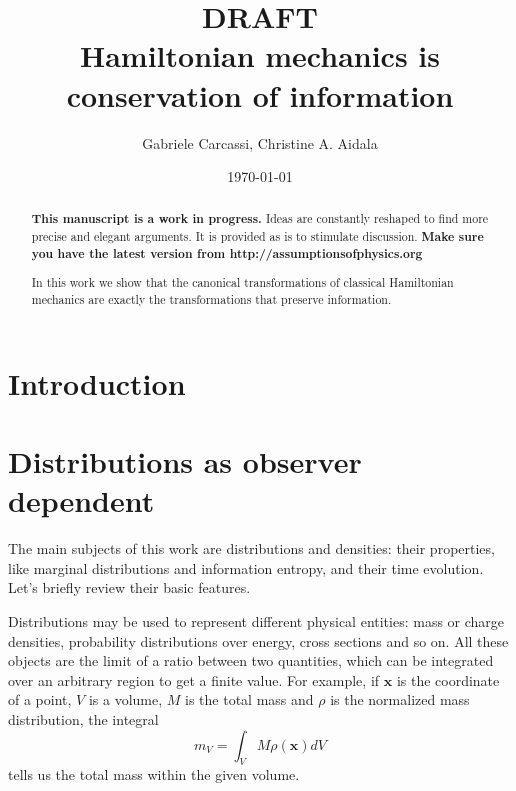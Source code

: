 \documentclass[smallextended]{svjour3}
\numberwithin{equation}{section}
\theoremstyle{definition}
\newcommand{\journal}[1]{\ifjournal#1\fi}
\newcommand{\arxiv}[1]{\ifjournal\else#1\fi}
\begin{document}
\title{DRAFT \\ Hamiltonian mechanics is conservation of information}
\author{Gabriele Carcassi, Christine A. Aidala}

\ifjournal
\else
\fi


\date{\today}

\journal{\maketitle}
	
\begin{abstract}
\textbf{This manuscript is a work in progress.} Ideas are constantly reshaped to find more precise and elegant arguments. It is provided as is to stimulate discussion.  \textbf{Make sure you have the latest version from http://assumptionsofphysics.org}

In this work we show that the canonical transformations of classical Hamiltonian mechanics are exactly the transformations that preserve information.
\end{abstract}

\arxiv{\maketitle}

\section{Introduction}

\section{Distributions as observer dependent}

The main subjects of this work are distributions and densities: their properties, like marginal distributions and information entropy, and their time evolution. Let's briefly review their basic features.

Distributions may be used to represent different  physical entities: mass or charge densities, probability distributions over energy, cross sections and so on. All these objects are the limit of a ratio between two quantities, which can be integrated over an arbitrary region to get a finite value. For example, if $\mathbf{x}$ is the coordinate of a point, $V$ is a volume, $M$ is the total mass and $\rho$ is the normalized mass distribution, the integral
\begin{equation}
m_V =\int_V M \rho(\mathbf{x}) dV
\end{equation}
tells us the total mass within the given volume.
\end{document}
